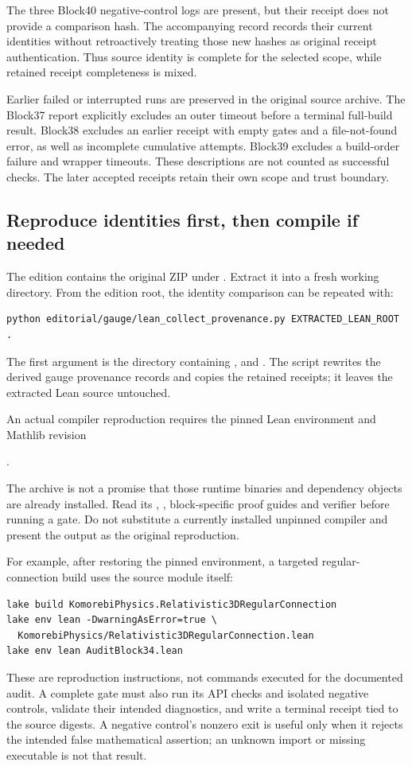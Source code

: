 The three Block40 negative-control logs are present, but their receipt does not provide a comparison hash. The accompanying record records their current identities without retroactively treating those new hashes as original receipt authentication. Thus source identity is complete for the selected scope, while retained receipt completeness is mixed.

Earlier failed or interrupted runs are preserved in the original source archive. The Block37 report explicitly excludes an outer timeout before a terminal full-build result. Block38 excludes an earlier receipt with empty gates and a file-not-found error, as well as incomplete cumulative attempts. Block39 excludes a build-order failure and wrapper timeouts. These descriptions are not counted as successful checks. The later accepted receipts retain their own scope and trust boundary.

\subsection{Reproduce identities first, then compile if needed}

The edition contains the original ZIP under . Extract it into a fresh working directory. From the edition root, the identity comparison can be repeated with:
\begin{lstlisting}
python editorial/gauge/lean_collect_provenance.py EXTRACTED_LEAN_ROOT .
\end{lstlisting}
The first argument is the directory containing ,  and . The script rewrites the derived gauge provenance records and copies the retained receipts; it leaves the extracted Lean source untouched.

An actual compiler reproduction requires the pinned Lean  environment and Mathlib revision
\begin{center}.\end{center}
The archive is not a promise that those runtime binaries and dependency objects are already installed. Read its , , block-specific proof guides and verifier before running a gate. Do not substitute a currently installed unpinned compiler and present the output as the original reproduction.

For example, after restoring the pinned environment, a targeted regular-connection build uses the source module itself:
\begin{lstlisting}
lake build KomorebiPhysics.Relativistic3DRegularConnection
lake env lean -DwarningAsError=true \
  KomorebiPhysics/Relativistic3DRegularConnection.lean
lake env lean AuditBlock34.lean
\end{lstlisting}
These are reproduction instructions, not commands executed for the documented audit. A complete gate must also run its API checks and isolated negative controls, validate their intended diagnostics, and write a terminal receipt tied to the source digests. A negative control's nonzero exit is useful only when it rejects the intended false mathematical assertion; an unknown import or missing executable is not that result.

